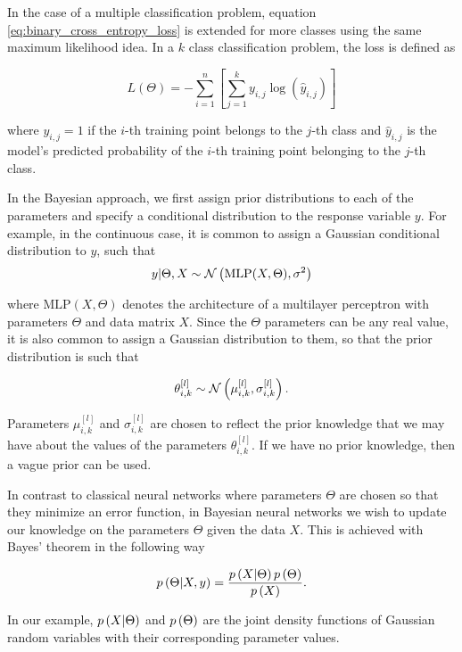 In the case of a multiple classification problem, equation \ref{eq:binary_cross_entropy_loss} is extended for more classes using the same maximum likelihood idea. In a $k$ class classification problem, the loss is defined as

\begin{equation*}
  L(\Theta) = - \sum_{i = 1}^n \left[ \sum_{j = 1}^k y_{i,j} \log{\left( \hat{y}_{i,j} \right)}  \right]
\end{equation*}

where $y_{i,j} = 1$ if the $i$-th training point belongs to the $j$-th class and $\hat{y}_{i,j}$ is the model's predicted probability of the $i$-th training point belonging to the $j$-th class.

In the Bayesian approach, we first assign prior distributions to each of the parameters and specify a conditional distribution to the response variable $y$. For example, in the continuous case, it is common to assign a Gaussian conditional distribution to $y$, such that
$$
  y | \Theta, X \sim \mathcal{N}\left( \mathrm{MLP}(X, \Theta), \sigma^2 \right)
$$

where $\mathrm{MLP}(X, \Theta)$ denotes the architecture of a multilayer perceptron with parameters $\Theta$ and data matrix $X$. Since the $\Theta$ parameters can be any real value, it is also common to assign a Gaussian distribution to them, so that the prior distribution is such that

$$
  \theta_{i,k}^{[l]} \sim \mathcal{N}\left( \mu_{i,k}^{[l]}, \sigma_{i,k}^{[l]} \right).
$$

Parameters $\mu_{i,k}^{[l]}$ and $\sigma_{i,k}^{[l]}$ are chosen to reflect the prior knowledge that we may have about the values of the parameters $\theta_{i,k}^{[l]}$. If we have no prior knowledge, then a vague prior can be used.

In contrast to classical neural networks where parameters $\Theta$ are chosen so that they minimize an error function, in Bayesian neural networks we wish to update our knowledge on the parameters $\Theta$ given the data $X$. This is achieved with Bayes' theorem in the following way

$$
  p\left( \Theta | X, y \right) = \frac{p\left( X | \Theta \right) p\left( \Theta \right)}{p\left( X \right)}.
$$

In our example, $p\left( X | \Theta \right)$ and $p\left( \Theta \right)$ are the joint density functions of Gaussian random variables with their corresponding parameter values.

